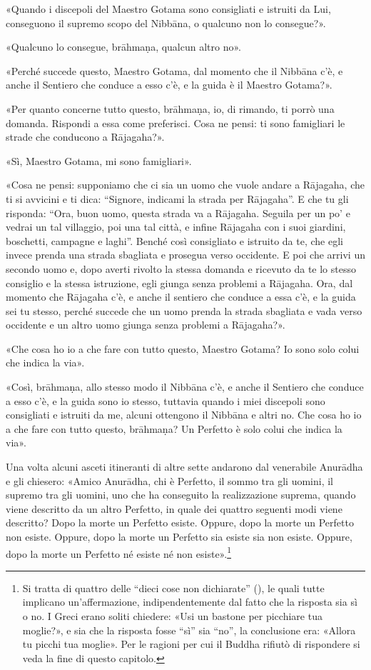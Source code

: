 

«Quando i discepoli del Maestro Gotama sono consigliati e istruiti da
Lui, conseguono il supremo scopo del Nibbāna, o qualcuno non lo
consegue?».


«Qualcuno lo consegue, brāhmaṇa, qualcun altro no».


«Perché succede questo, Maestro Gotama, dal momento che il Nibbāna c’è,
e anche il Sentiero che conduce a esso c’è, e la guida è il Maestro
Gotama?».


«Per quanto concerne tutto questo, brāhmaṇa, io, di rimando, ti porrò
una domanda. Rispondi a essa come preferisci. Cosa ne pensi: ti sono
famigliari le strade che conducono a Rājagaha?».


«Sì, Maestro Gotama, mi sono famigliari».


«Cosa ne pensi: supponiamo che ci sia un uomo che vuole andare a
Rājagaha, che ti si avvicini e ti dica: “Signore, indicami la strada per
Rājagaha”. E che tu gli risponda: “Ora, buon uomo, questa strada va a
Rājagaha. Seguila per un po’ e vedrai un tal villaggio, poi una tal
città, e infine Rājagaha con i suoi giardini, boschetti, campagne e
laghi”. Benché così consigliato e istruito da te, che egli invece prenda
una strada sbagliata e prosegua verso occidente. E poi che arrivi un
secondo uomo e, dopo averti rivolto la stessa domanda e ricevuto da te
lo stesso consiglio e la stessa istruzione, egli giunga senza problemi a
Rājagaha. Ora, dal momento che Rājagaha c’è, e anche il sentiero che
conduce a essa c’è, e la guida sei tu stesso, perché succede che un uomo
prenda la strada sbagliata e vada verso occidente e un altro uomo giunga
senza problemi a Rājagaha?».


«Che cosa ho io a che fare con tutto questo, Maestro Gotama? Io sono
solo colui che indica la via».


«Così, brāhmaṇa, allo stesso modo il Nibbāna c’è, e anche il Sentiero
che conduce a esso c’è, e la guida sono io stesso, tuttavia quando i
miei discepoli sono consigliati e istruiti da me, alcuni ottengono il
Nibbāna e altri no. Che cosa ho io a che fare con tutto questo,
brāhmaṇa? Un Perfetto è solo colui che indica la via».




Una volta alcuni asceti itineranti di altre sette andarono dal
venerabile Anurādha e gli chiesero: «Amico Anurādha, chi è Perfetto, il
sommo tra gli uomini, il supremo tra gli uomini, uno che ha conseguito
la realizzazione suprema, quando viene descritto da un altro Perfetto,
in quale dei quattro seguenti modi viene descritto? Dopo la morte un
Perfetto esiste. Oppure, dopo la morte un Perfetto non esiste. Oppure,
dopo la morte un Perfetto sia esiste sia non esiste. Oppure, dopo la
morte un Perfetto né esiste né non esiste».\footnote{Si tratta di quattro delle “dieci cose non dichiarate” (\hyperlink{cap-12-La-Dottrina#pag230}{}), le quali tutte implicano un’affermazione, indipendentemente dal fatto che la risposta sia sì o no. I Greci erano soliti chiedere: «Usi un bastone per picchiare tua moglie?», e sia che la risposta fosse “sì” sia “no”, la conclusione era: «Allora tu picchi tua moglie». Per le ragioni per cui il Buddha rifiutò di rispondere si veda la fine di questo capitolo.}


